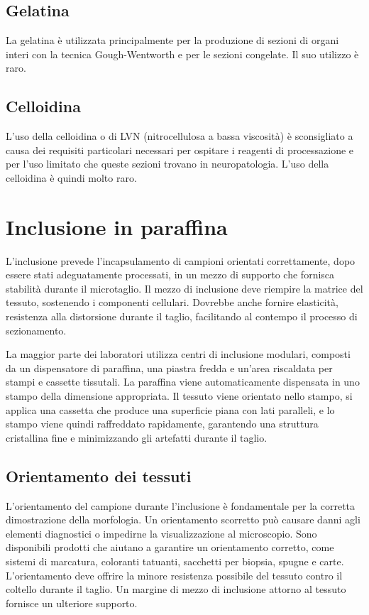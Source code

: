 \subsection{Gelatina}
La gelatina è utilizzata principalmente per la produzione di sezioni di organi interi con la tecnica Gough-Wentworth e per le sezioni congelate. Il suo utilizzo è raro.

\subsection{Celloidina}
L'uso della celloidina o di LVN (nitrocellulosa a bassa viscosità) è sconsigliato a causa dei requisiti particolari necessari per ospitare i reagenti di processazione e per l'uso limitato che queste sezioni trovano in neuropatologia. L'uso della celloidina è quindi molto raro.

\section{Inclusione in paraffina}
L'inclusione prevede l'incapsulamento di campioni orientati correttamente, dopo essere stati adeguatamente processati, in un mezzo di supporto che fornisca stabilità durante il microtaglio. Il mezzo di inclusione deve riempire la matrice del tessuto, sostenendo i componenti cellulari. Dovrebbe anche fornire elasticità, resistenza alla distorsione durante il taglio, facilitando al contempo il processo di sezionamento.

La maggior parte dei laboratori utilizza centri di inclusione modulari, composti da un dispensatore di paraffina, una piastra fredda e un'area riscaldata per stampi e cassette tissutali. La paraffina viene automaticamente dispensata in uno stampo della dimensione appropriata. Il tessuto viene orientato nello stampo, si applica una cassetta che produce una superficie piana con lati paralleli, e lo stampo viene quindi raffreddato rapidamente, garantendo una struttura cristallina fine e minimizzando gli artefatti durante il taglio.

\subsection{Orientamento dei tessuti}
L'orientamento del campione durante l'inclusione è fondamentale per la corretta dimostrazione della morfologia. Un orientamento scorretto può causare danni agli elementi diagnostici o impedirne la visualizzazione al microscopio. Sono disponibili prodotti che aiutano a garantire un orientamento corretto, come sistemi di marcatura, coloranti tatuanti, sacchetti per biopsia, spugne e carte. L'orientamento deve offrire la minore resistenza possibile del tessuto contro il coltello durante il taglio. Un margine di mezzo di inclusione attorno al tessuto fornisce un ulteriore supporto.

